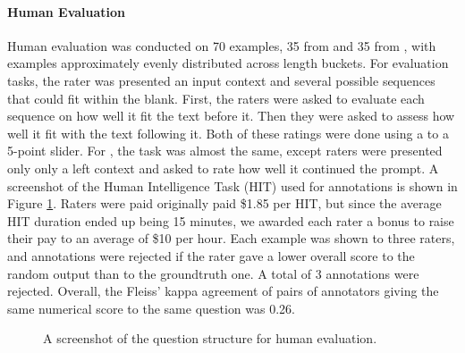 \paragraph{Human Evaluation}
Human evaluation was conducted on 70 examples, 35 from \rwpFITB{} and 35 from \rwpFITE, with examples approximately evenly distributed across length buckets.
For \rwpFITB{} evaluation tasks, the rater was presented an input context and several possible sequences that could fit within the blank. 
First, the raters were asked to evaluate each sequence on how well it fit the text before it.
Then they were asked to assess how well it fit with the text following it.
Both of these ratings were done using a to a 5-point slider.
For \rwpFITB{}, the task was almost the same, except raters were presented only only a left context and asked to rate how well it continued the prompt.
A screenshot of the Human Intelligence Task (HIT) used for annotations is shown in Figure \ref{fig:amturk_ui}. Raters were paid originally paid \$1.85 per HIT, but since the average HIT duration ended up being 15 minutes, we awarded each rater a bonus to raise their pay to an average of \$10 per hour.
Each example was shown to three raters, and annotations were rejected if the rater gave a lower overall score to the random output than to the groundtruth one.
A total of 3 annotations were rejected.
Overall, the Fleiss' kappa agreement of pairs of annotators giving the same numerical score to the same question was 0.26.

\begin{figure}[tbp]
    \centering
    \caption{A screenshot of the question structure for human evaluation.}
    \label{fig:amturk_ui}
\end{figure}

